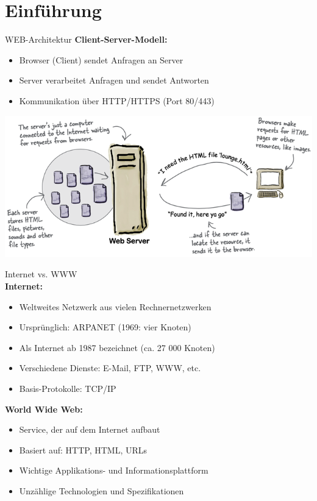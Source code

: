 \section{Einführung}

\begin{definition}{WEB-Architektur}
    \textbf{Client-Server-Modell:}
    \begin{itemize}
        \item Browser (Client) sendet Anfragen an Server
        \item Server verarbeitet Anfragen und sendet Antworten
        \item Kommunikation über HTTP/HTTPS (Port 80/443)
    \end{itemize}
    \includegraphics[width=0.8\linewidth]{images/web_architektur.png}
\end{definition}

\begin{theorem}{Internet vs. WWW}\\
    \textbf{Internet:}
    \begin{itemize}
        \item Weltweites Netzwerk aus vielen Rechnernetzwerken
        \item Ursprünglich: ARPANET (1969: vier Knoten)
        \item Als Internet ab 1987 bezeichnet (ca. 27 000 Knoten)
        \item Verschiedene Dienste: E-Mail, FTP, WWW, etc.
        \item Basis-Protokolle: TCP/IP
    \end{itemize}
    
    \textbf{World Wide Web:}
    \begin{itemize}
        \item Service, der auf dem Internet aufbaut
        \item Basiert auf: HTTP, HTML, URLs
        \item Wichtige Applikations- und Informationsplattform
        \item Unzählige Technologien und Spezifikationen
    \end{itemize}
\end{theorem}


